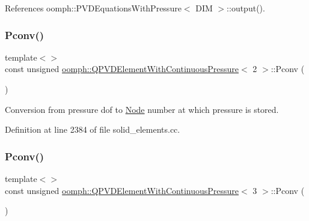 References oomph\+::\+P\+V\+D\+Equations\+With\+Pressure$<$ D\+I\+M $>$\+::output().

\mbox{\label{classoomph_1_1QPVDElementWithContinuousPressure_ad9be9df37b37b482608f606f4e0190aa}} 
\subsubsection{\texorpdfstring{Pconv()}{Pconv()}\hspace{0.1cm}{\footnotesize\ttfamily [1/2]}}
{\footnotesize\ttfamily template$<$$>$ \\
const unsigned \hyperlink{classoomph_1_1QPVDElementWithContinuousPressure}{oomph\+::\+Q\+P\+V\+D\+Element\+With\+Continuous\+Pressure}$<$ 2 $>$\+::Pconv (\begin{DoxyParamCaption}{ }\end{DoxyParamCaption})\hspace{0.3cm}{\ttfamily [protected]}}



Conversion from pressure dof to \hyperlink{classoomph_1_1Node}{Node} number at which pressure is stored. 



Definition at line 2384 of file solid\+\_\+elements.\+cc.

\mbox{\label{classoomph_1_1QPVDElementWithContinuousPressure_af4a484429d02002a102c5b158bd724b8}} 
\subsubsection{\texorpdfstring{Pconv()}{Pconv()}\hspace{0.1cm}{\footnotesize\ttfamily [2/2]}}
{\footnotesize\ttfamily template$<$$>$ \\
const unsigned \hyperlink{classoomph_1_1QPVDElementWithContinuousPressure}{oomph\+::\+Q\+P\+V\+D\+Element\+With\+Continuous\+Pressure}$<$ 3 $>$\+::Pconv (\begin{DoxyParamCaption}{ }\end{DoxyParamCaption})\hspace{0.3cm}{\ttfamily [protected]}}



